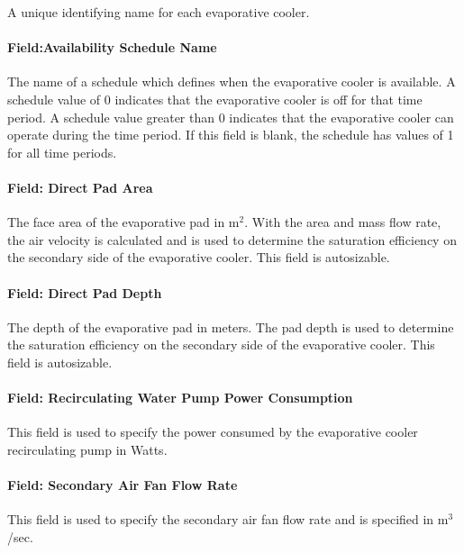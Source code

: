 A unique identifying name for each evaporative cooler.

\paragraph{Field:Availability Schedule Name}\label{fieldavailability-schedule-name-1}

The name of a schedule which defines when the evaporative cooler is available. A schedule value of 0 indicates that the evaporative cooler is off for that time period. A schedule value greater than 0 indicates that the evaporative cooler can operate during the time period. If this field is blank, the schedule has values of 1 for all time periods.

\paragraph{Field: Direct Pad Area}\label{field-direct-pad-area-1}

The face area of the evaporative pad in m\(^{2}\). With the area and mass flow rate, the air velocity is calculated and is used to determine the saturation efficiency on the secondary side of the evaporative cooler. This field is autosizable.

\paragraph{Field: Direct Pad Depth}\label{field-direct-pad-depth-1}

The depth of the evaporative pad in meters. The pad depth is used to determine the saturation efficiency on the secondary side of the evaporative cooler. This field is autosizable.

\paragraph{Field: Recirculating Water Pump Power Consumption}\label{field-recirculating-water-pump-power-consumption-1}

This field is used to specify the power consumed by the evaporative cooler recirculating pump in Watts.

\paragraph{Field: Secondary Air Fan Flow Rate}\label{field-secondary-air-fan-flow-rate}

This field is used to specify the secondary air fan flow rate and is specified in m\(^{3}\)/sec.

